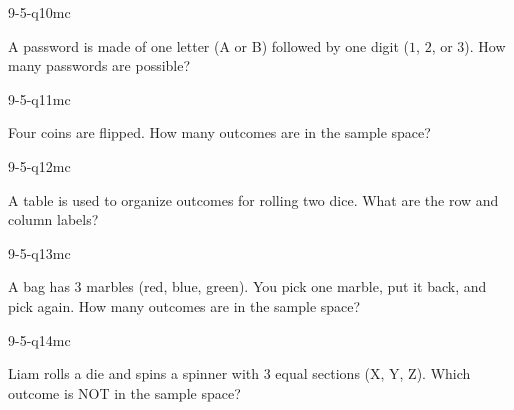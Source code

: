 \begin{practiceQuestion}{9-5-q10}{mc}
\begin{questionText}
A password is made of one letter (A or B) followed by one digit ($1$, $2$, or $3$). How many passwords are possible?
\end{questionText}
\end{practiceQuestion}

\begin{practiceQuestion}{9-5-q11}{mc}
\begin{questionText}
Four coins are flipped. How many outcomes are in the sample space?
\end{questionText}
\end{practiceQuestion}

\begin{practiceQuestion}{9-5-q12}{mc}
\begin{questionText}
A table is used to organize outcomes for rolling two dice. What are the row and column labels?
\end{questionText}
\end{practiceQuestion}

\begin{practiceQuestion}{9-5-q13}{mc}
\begin{questionText}
A bag has $3$ marbles (red, blue, green). You pick one marble, put it back, and pick again. How many outcomes are in the sample space?
\end{questionText}
\end{practiceQuestion}

\begin{practiceQuestion}{9-5-q14}{mc}
\begin{questionText}
Liam rolls a die and spins a spinner with $3$ equal sections (X, Y, Z). Which outcome is NOT in the sample space?
\end{questionText}
\end{practiceQuestion}

